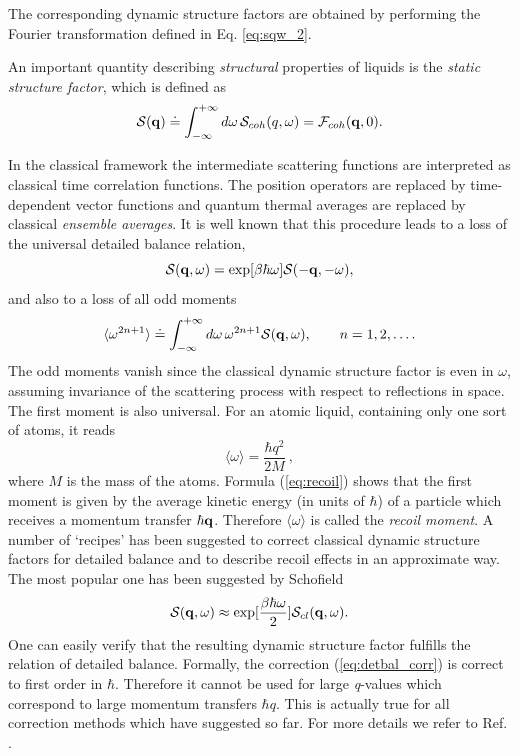 \documentclass[a4paper,11pt]{article}
\newcommand{\qval}{\textit{q}}
\begin{document}
The corresponding dynamic structure factors are obtained by performing the Fourier transformation defined in 
Eq. \ref{eq:sqw_2}.

An important quantity describing {\em structural} properties of liquids is the {\em static structure factor}, which 
is defined as
\begin{equation}
\label{eq:sq}
{\cal S}({\bf q}) \doteq \int_{-\infty}^{+\infty}d\omega\,
{\cal S}_{coh}(q,\omega) = {\cal F}_{coh}({\bf q},0).
\end{equation}

In the classical framework the intermediate scattering functions are interpreted as classical time correlation functions. 
The position operators are replaced by time-dependent vector functions and quantum thermal averages are replaced by classical 
{\em ensemble averages}. It is well known that this procedure leads to a loss of the universal detailed balance relation,
\begin{equation}
\label{eq:detbal}
{\cal S}({\bf q},\omega) = \exp[\beta\hbar\omega]
{\cal S}(-{\bf q},-\omega),
\end{equation}
and also to a loss of all odd moments
\begin{equation}
\label{eq:moments}
\langle\omega^{2n+1}\rangle \doteq
\int_{-\infty}^{+\infty}d\omega\,\omega^{2n+1} {\cal S}({\bf
q},\omega), \qquad n = 1,2,\ldots.
\end{equation}
The odd moments vanish since the classical dynamic structure factor is even in $\omega$, assuming invariance of the scattering 
process with respect to reflections in space. The first moment is also universal. For an atomic liquid, containing only one 
sort of atoms, it reads
\begin{equation}
\label{eq:recoil}
\langle\omega\rangle = \frac{\hbar q^2}{2M}\:,
\end{equation} 
where $M$ is the mass of the atoms.  Formula (\ref{eq:recoil}) shows that the first moment is given by the average kinetic 
energy (in units of $\hbar$) of a particle  which receives a momentum transfer 
$\hbar {\bf q}$. Therefore $\langle\omega\rangle$ is called  the {\em recoil moment}. A number of `recipes' has been 
suggested to correct classical dynamic structure factors for detailed balance and to describe recoil effects in an 
approximate way. The most popular one has been suggested by Schofield \cite{Schofield}
\begin{equation}
\label{eq:detbal_corr}
{\cal S}({\bf q},\omega) \approx
\exp[\frac{\beta\hbar\omega}{2}]{\cal S}_{cl}({\bf q},\omega).
\end{equation}
One can easily verify that the resulting dynamic structure factor fulfills the relation of detailed balance. Formally, the 
correction (\ref{eq:detbal_corr}) is correct to first order in $\hbar$. Therefore it cannot be used for large \qval-values which 
correspond to large momentum transfers  $\hbar q$. This is actually true for all correction methods which have suggested so far. 
For more details we refer to Ref. \cite{Kneller:1994}.
\end{document}

